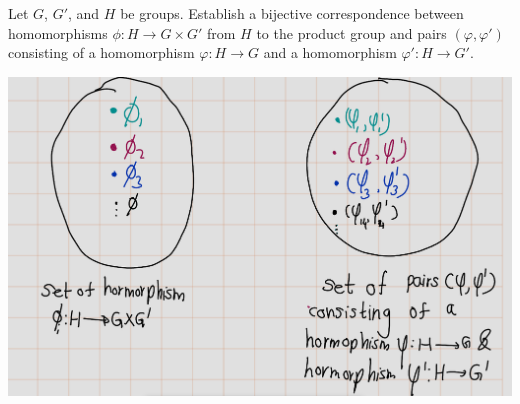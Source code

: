\documentclass[
]{book}
\begin{document}
\leavevmode{}%
Let \(G\), \(G'\), and \(H\) be groups. Establish a bijective
correspondence between homomorphisms \(\phi : H \to G \times G'\) from
\(H\) to the product group and pairs \((\varphi, \varphi')\) consisting
of a homomorphism \(\varphi:H \to G\) and a homomorphism
\(\varphi':H \to G'\).

\includegraphics{figures/ch_2/fig10.png}
\end{document}
